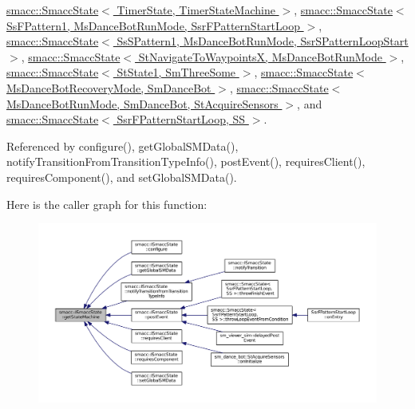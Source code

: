 \hyperlink{classsmacc_1_1SmaccState_afc39f8e0ca4001b2159a100da2fccd0e}{smacc\+::\+Smacc\+State$<$ Timer\+State, Timer\+State\+Machine $>$}, \hyperlink{classsmacc_1_1SmaccState_afc39f8e0ca4001b2159a100da2fccd0e}{smacc\+::\+Smacc\+State$<$ Ss\+F\+Pattern1, Ms\+Dance\+Bot\+Run\+Mode, Ssr\+F\+Pattern\+Start\+Loop $>$}, \hyperlink{classsmacc_1_1SmaccState_afc39f8e0ca4001b2159a100da2fccd0e}{smacc\+::\+Smacc\+State$<$ Ss\+S\+Pattern1, Ms\+Dance\+Bot\+Run\+Mode, Ssr\+S\+Pattern\+Loop\+Start $>$}, \hyperlink{classsmacc_1_1SmaccState_afc39f8e0ca4001b2159a100da2fccd0e}{smacc\+::\+Smacc\+State$<$ St\+Navigate\+To\+Waypoints\+X, Ms\+Dance\+Bot\+Run\+Mode $>$}, \hyperlink{classsmacc_1_1SmaccState_afc39f8e0ca4001b2159a100da2fccd0e}{smacc\+::\+Smacc\+State$<$ St\+State1, Sm\+Three\+Some $>$}, \hyperlink{classsmacc_1_1SmaccState_afc39f8e0ca4001b2159a100da2fccd0e}{smacc\+::\+Smacc\+State$<$ Ms\+Dance\+Bot\+Recovery\+Mode, Sm\+Dance\+Bot $>$}, \hyperlink{classsmacc_1_1SmaccState_afc39f8e0ca4001b2159a100da2fccd0e}{smacc\+::\+Smacc\+State$<$ Ms\+Dance\+Bot\+Run\+Mode, Sm\+Dance\+Bot, St\+Acquire\+Sensors $>$}, and \hyperlink{classsmacc_1_1SmaccState_afc39f8e0ca4001b2159a100da2fccd0e}{smacc\+::\+Smacc\+State$<$ Ssr\+F\+Pattern\+Start\+Loop, S\+S $>$}.



Referenced by configure(), get\+Global\+S\+M\+Data(), notify\+Transition\+From\+Transition\+Type\+Info(), post\+Event(), requires\+Client(), requires\+Component(), and set\+Global\+S\+M\+Data().



Here is the caller graph for this function\+:
\nopagebreak
\begin{figure}[H]
\begin{center}
\leavevmode
\includegraphics[width=350pt]{classsmacc_1_1ISmaccState_a562bb3f9a3ac16b8be71e4794c9e7523_icgraph}
\end{center}
\end{figure}


